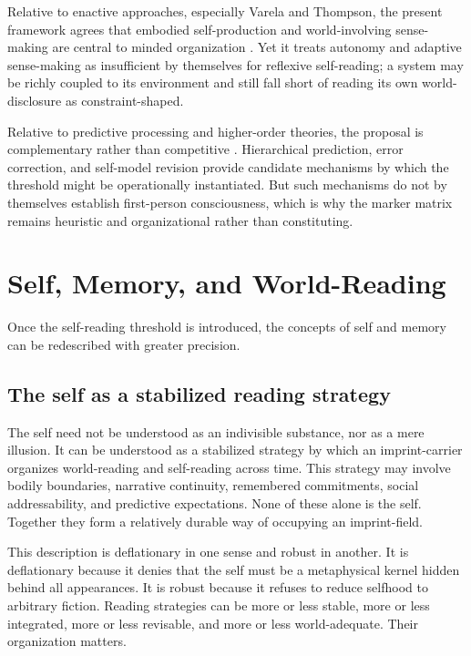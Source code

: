 \documentclass[12pt]{article}
\begin{document}
Relative to enactive approaches, especially Varela and Thompson, the present framework agrees that embodied self-production and world-involving sense-making are central to minded organization \cite{VarelaThompsonRosch1991,Thompson2007}. Yet it treats autonomy and adaptive sense-making as insufficient by themselves for reflexive self-reading; a system may be richly coupled to its environment and still fall short of reading its own world-disclosure as constraint-shaped.

Relative to predictive processing and higher-order theories, the proposal is complementary rather than competitive \cite{Friston2010,Clark2013,Rosenthal2005,LauRosenthal2011}. Hierarchical prediction, error correction, and self-model revision provide candidate mechanisms by which the threshold might be operationally instantiated. But such mechanisms do not by themselves establish first-person consciousness, which is why the marker matrix remains heuristic and organizational rather than constituting.

\section{Self, Memory, and World-Reading}

Once the self-reading threshold is introduced, the concepts of self and memory can be redescribed with greater precision.

\subsection{The self as a stabilized reading strategy}

The self need not be understood as an indivisible substance, nor as a mere illusion. It can be understood as a stabilized strategy by which an imprint-carrier organizes world-reading and self-reading across time. This strategy may involve bodily boundaries, narrative continuity, remembered commitments, social addressability, and predictive expectations. None of these alone is the self. Together they form a relatively durable way of occupying an imprint-field.

This description is deflationary in one sense and robust in another. It is deflationary because it denies that the self must be a metaphysical kernel hidden behind all appearances. It is robust because it refuses to reduce selfhood to arbitrary fiction. Reading strategies can be more or less stable, more or less integrated, more or less revisable, and more or less world-adequate. Their organization matters.
\end{document}
